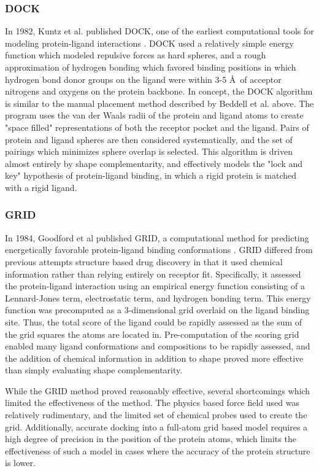 \subsubsection{DOCK}
In 1982, Kuntz et al. published DOCK, one of the earliest computational tools for modeling protein-ligand interactions \citep{Kuntz:1982wx}.  DOCK used a relatively simple energy function which modeled repulsive forces as hard spheres, and a rough approximation of hydrogen bonding which favored binding positions in which hydrogen bond donor groups on the ligand were within 3-5 \AA\ of acceptor nitrogens and oxygens on the protein backbone.
In concept, the DOCK algorithm is similar to the manual placement method described by Beddell et al. above. 
The program uses the van der Waals radii of the protein and ligand atoms to create "space filled" representations of both the receptor pocket and the ligand.
Pairs of protein and ligand spheres are then considered systematically, and the set of pairings which minimizes sphere overlap is selected.
This algorithm is driven almost entirely by shape complementarity, and effectively models the "lock and key" hypothesis of protein-ligand binding, in which a rigid protein is matched with a rigid ligand.

\subsubsection{GRID}
In 1984, Goodford et al published GRID, a computational method for predicting energetically favorable protein-ligand binding conformations \citep{Goodford:1985bf}.
GRID differed from previous attempts structure based drug discovery in that it used chemical information rather than relying entirely on receptor fit. 
Specifically, it assessed the protein-ligand interaction using an empirical energy function consisting of a Lennard-Jones term, electrostatic term, and hydrogen bonding term.
This energy function was precomputed as a 3-dimensional grid overlaid on the ligand binding site.
Thus, the total score of the ligand could be rapidly assessed as the sum of the grid squares the atoms are located in.
Pre-computation of the scoring grid enabled many ligand conformations and compositions to be rapidly assessed, and the addition of chemical information in addition to shape proved more effective than simply evaluating shape complementarity.

While the GRID method proved reasonably effective, several shortcomings which limited the effectiveness of the method.
The physics based force field used was relatively rudimentary, and the limited set of chemical probes used to create the grid.
Additionally, accurate docking into a full-atom grid based model requires a high degree of precision in the position of the protein atoms, which limits the effectiveness of such a model in cases where the accuracy of the protein structure is lower.

